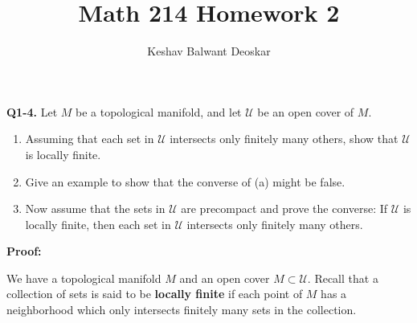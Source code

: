 \documentclass{article}
\title{Math 214 Homework 2}
\author{Keshav Balwant Deoskar}
\begin{document}
\maketitle



\textbf{Q1-4.} Let $M$ be a topological manifold, and let $\mathcal U$ be an open cover of $M$.
\begin{enumerate}[label=(\alph*)]
  \item Assuming that each set in $\mathcal U$ intersects only finitely many others, show that $\mathcal U$ is locally finite.
  \item Give an example to show that the converse of (a) might be false.
  \item Now assume that the sets in $\mathcal U$ are precompact and prove the converse: If $\mathcal U$ is locally finite, then each set in $\mathcal U$ intersects only finitely many others. 
\end{enumerate}

\vskip 0.5cm
\textbf{Proof:}

\vskip 0.5cm
We have a topological manifold $M$ and an open cover $M \subset \mathcal U$. Recall that a collection of sets is said to be \textbf{locally finite} if each point of $M$ has a neighborhood which only intersects finitely many sets in the collection.
\end{document}
